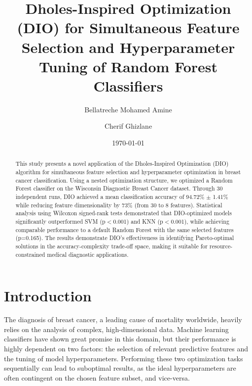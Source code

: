 \documentclass[12pt, a4paper]{article}
\begin{document}
\title{
    \textbf{Dholes-Inspired Optimization (DIO) for Simultaneous Feature Selection and Hyperparameter Tuning of Random Forest Classifiers}
}
\author[1]{Bellatreche Mohamed Amine}
\author[2]{Cherif Ghizlane}
\date{\today}
\maketitle
\thispagestyle{empty}

\newpage

\begin{abstract}
\noindent This study presents a novel application of the Dholes-Inspired Optimization (DIO) algorithm for simultaneous feature selection and hyperparameter optimization in breast cancer classification. Using a nested optimization structure, we optimized a Random Forest classifier on the Wisconsin Diagnostic Breast Cancer dataset. Through 30 independent runs, DIO achieved a mean classification accuracy of 94.72\% $\pm$ 1.41\% while reducing feature dimensionality by 73\% (from 30 to 8 features). Statistical analysis using Wilcoxon signed-rank tests demonstrated that DIO-optimized models significantly outperformed SVM (p$<$0.001) and KNN (p$<$0.001), while achieving comparable performance to a default Random Forest with the same selected features (p=0.165). The results demonstrate DIO's effectiveness in identifying Pareto-optimal solutions in the accuracy-complexity trade-off space, making it suitable for resource-constrained medical diagnostic applications.
\end{abstract}

\tableofcontents
\newpage

\section{Introduction}

The diagnosis of breast cancer, a leading cause of mortality worldwide, heavily relies on the analysis of complex, high-dimensional data. Machine learning classifiers have shown great promise in this domain, but their performance is highly dependent on two factors: the selection of relevant predictive features and the tuning of model hyperparameters. Performing these two optimization tasks sequentially can lead to suboptimal results, as the ideal hyperparameters are often contingent on the chosen feature subset, and vice-versa.
\end{document}
